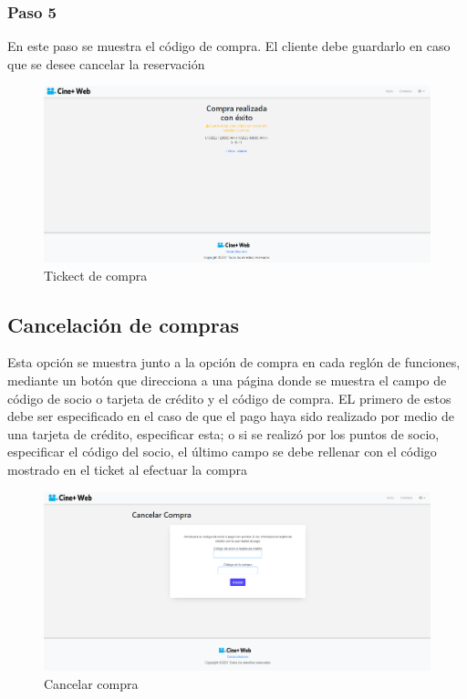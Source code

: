 \subsubsection{Paso 5}
En este paso se muestra el c\'odigo de compra. El cliente debe guardarlo en caso que se desee cancelar la reservaci\'on

\begin{figure}[h!]
	\centering
	\includegraphics[scale=0.35]{./chapters/img/ticketpurchase3.png}
	
	\label{fig:ticketpurchase3}
	\caption{Tickect de compra}
	
\end{figure}

\subsection{Cancelaci\'on de compras}
Esta opci\'on se muestra junto a la opci\'on de compra en cada regl\'on de funciones, mediante un bot\'on que direcciona a una p\'agina donde se muestra el campo de c\'odigo de socio o tarjeta de cr\'edito y el c\'odigo de compra. EL primero de estos debe ser especificado en el caso de que el pago haya sido realizado por medio de una tarjeta de cr\'edito, especificar esta; o si se realiz\'o por los puntos de socio, especificar el c\'odigo del socio, el \'ultimo campo se debe rellenar con el c\'odigo mostrado en el ticket al efectuar la compra

\begin{figure}[h!]
	\centering
	\includegraphics[scale=0.35]{./chapters/img/cancel.png}
	
	\label{fig:cancel}
	\caption{Cancelar compra}
	
\end{figure}
